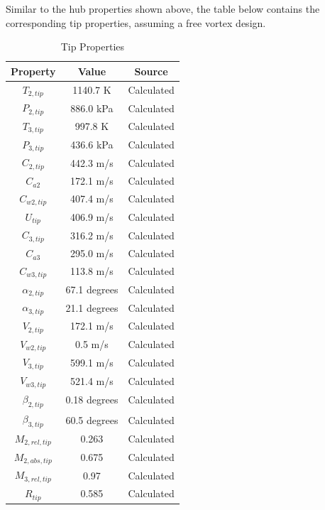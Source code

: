 \documentclass[12pt, letter]{report}
\begin{document}
Similar to the hub properties shown above, the table below contains the corresponding tip properties, assuming a free vortex design.

\begin{table}[H]
\caption{Tip Properties}
\centering
\begin{tabular}{|c|c|c|}
\hline
\textbf{Property} & \textbf{Value} & \textbf{Source} \\ \hline
$T_{2,tip}$ & 1140.7 K & Calculated\\ \hline
$P_{2,tip}$ & 886.0 kPa & Calculated\\ \hline
$T_{3,tip}$ & 997.8 K & Calculated\\ \hline
$P_{3,tip}$ & 436.6 kPa & Calculated\\ \hline
$C_{2,tip}$ & 442.3 m/s & Calculated\\ \hline
$C_{a2}$ & 172.1 m/s & Calculated\\ \hline
$C_{w2,tip}$ & 407.4 m/s & Calculated\\ \hline
$U_{tip}$ & 406.9 m/s &Calculated \\ \hline
$C_{3,tip}$ & 316.2 m/s & Calculated\\ \hline
$C_{a3}$ & 295.0 m/s & Calculated\\ \hline
$C_{w3,tip}$ & 113.8 m/s & Calculated\\ \hline
$\alpha_{2,tip}$ & 67.1 degrees & Calculated\\ \hline
$\alpha_{3,tip}$ & 21.1 degrees & Calculated\\ \hline
$V_{2,tip}$ & 172.1 m/s & Calculated\\ \hline
$V_{w2,tip}$ & 0.5 m/s & Calculated\\\hline
$V_{3,tip}$ & 599.1 m/s & Calculated\\ \hline
$V_{w3,tip}$ & 521.4 m/s & Calculated\\\hline
$\beta_{2,tip}$ & 0.18 degrees & Calculated\\ \hline
$\beta_{3,tip}$ & 60.5 degrees & Calculated\\ \hline
$M_{2,rel,tip}$ & 0.263 &Calculated\\ \hline
$M_{2,abs,tip}$ & 0.675 & Calculated \\ \hline
$M_{3,rel,tip}$ & 0.97 & Calculated \\ \hline
$R_{tip}$ & 0.585 & Calculated \\ \hline
\end{tabular} 
\label{tab:my_label}
\end{table}
\par
\end{document}
